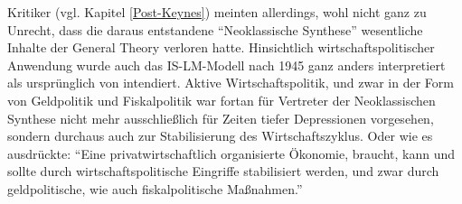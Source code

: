Kritiker (vgl. Kapitel \ref{Post-Keynes}) meinten allerdings, wohl nicht ganz zu Unrecht, dass die daraus entstandene "`Neoklassische Synthese"' wesentliche Inhalte der General Theory verloren hatte. Hinsichtlich wirtschaftspolitischer Anwendung wurde auch das IS-LM-Modell nach 1945 ganz anders interpretiert als ursprünglich von \textcite{Hicks1937} intendiert. Aktive Wirtschaftspolitik, und zwar in der Form von Geldpolitik und Fiskalpolitik war fortan für Vertreter der Neoklassischen Synthese nicht mehr ausschließlich für Zeiten tiefer Depressionen vorgesehen, sondern durchaus auch zur Stabilisierung des Wirtschaftszyklus. Oder wie es \textcite[S. 384]{Modigliani1977} ausdrückte: "`Eine privatwirtschaftlich organisierte Ökonomie, braucht, kann und sollte durch wirtschaftspolitische Eingriffe stabilisiert werden, und zwar durch geldpolitische, wie auch fiskalpolitische Maßnahmen."'

